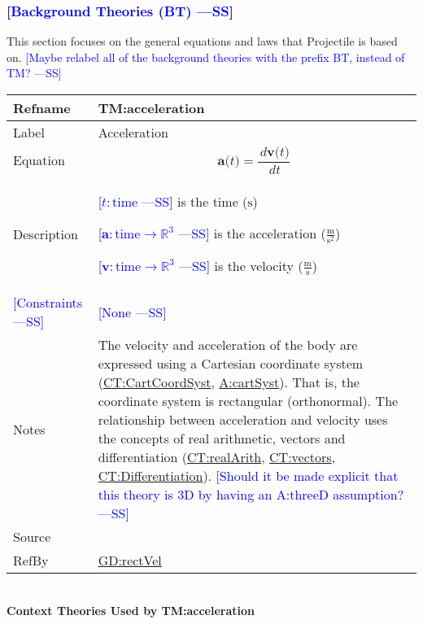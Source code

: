 \documentclass[12pt]{article}
\newcommand{\authornote}[3]{\textcolor{#1}{[#3 ---#2]}}
\newcommand{\authornote}[3]{}
\newcommand{\wss}[1]{\authornote{blue}{SS}{#1}}
\begin{document}
\subsubsection{\wss{Background Theories (BT)}}
\label{Sec:TMs}
This section focuses on the general equations and laws that Projectile is based
on.  \wss{Maybe relabel all of the background theories with the prefix BT,
instead of TM?}

\medskip
\noindent
\begin{minipage}{\textwidth}
\begin{tabular}{>{\raggedright}p{}>{\raggedright\arraybackslash}p{}}
\toprule \textbf{Refname} & \textbf{TM:acceleration}
\label{TM:acceleration}
\\ \midrule
Label & Acceleration
\\ \midrule
Equation & \begin{displaymath}
           \symbf{a}\text{(}t\text{)}=\frac{\,d\symbf{v}\text{(}t\text{)}}{\,dt}
           \end{displaymath}
\\ \midrule
Description & \begin{symbDescription}
              \item{\wss{$t: \text{time}$} is the time (${\text{s}}$)}
              \item{\wss{$\symbf{a}: \text{time} \rightarrow \mathbb{R}^3$} is the acceleration ($\frac{\text{m}}{\text{s}^{2}}$)}
              \item{\wss{$\symbf{v}: \text{time} \rightarrow \mathbb{R}^3$} is the velocity ($\frac{\text{m}}{\text{s}}$)}
              \end{symbDescription}
\\ \midrule
\wss{Constraints} & \wss{None}

\\ \midrule
Notes & The velocity and acceleration of the body are expressed using a
Cartesian coordinate system (\hyperref[CT:CartCoordSyst]{CT:CartCoordSyst},
\hyperref[cartSyst]{A:cartSyst}).  That is, the coordinate system is rectangular
(orthonormal). The relationship between acceleration and velocity uses the
concepts of real arithmetic, vectors and differentiation
(\hyperref[CT:realArith]{CT:realArith}, \hyperref[CT:vectors]{CT:vectors},
\hyperref[CT:Differentiation]{CT:Differentiation}). \wss{Should it be made
explicit that this theory is 3D by having an A:threeD assumption?}

\\ \midrule
Source & \cite{accelerationWiki}
         
\\ \midrule
RefBy & \hyperref[GD:rectVel]{GD:rectVel}
        
\\ \bottomrule
\end{tabular}
\end{minipage}
~\\
\noindent \textbf{Context Theories Used by TM:acceleration}
\end{document}
